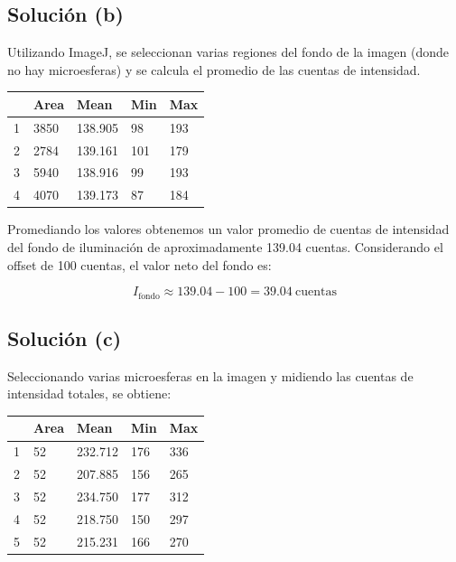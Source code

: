 \documentclass[11pt]{article}
\begin{document}
\subsection*{Solución (b)}

Utilizando ImageJ, se seleccionan varias regiones del fondo de la imagen (donde no hay microesferas) y se calcula el promedio de las cuentas de intensidad.

\begin{table}
    \centering
    \begin{tabular}{|l|l|l|l|l|}
    \hline
        ~ & Area & Mean & Min & Max \\ \hline
        1 & 3850 & 138.905 & 98 & 193 \\ \hline
        2 & 2784 & 139.161 & 101 & 179 \\ \hline
        3 & 5940 & 138.916 & 99 & 193 \\ \hline
        4 & 4070 & 139.173 & 87 & 184 \\ \hline
    \end{tabular}
\end{table}

Promediando los valores obtenemos un valor promedio de cuentas de intensidad del fondo de iluminación de aproximadamente 139.04 cuentas. Considerando el offset de 100 cuentas, el valor neto del fondo es:

\begin{equation*}
    I_{\text{fondo}} \approx 139.04 - 100 = 39.04\ \text{cuentas}
\end{equation*}

\subsection*{Solución (c)}

Seleccionando varias microesferas en la imagen y midiendo las cuentas de intensidad totales, se obtiene:

\begin{table}[!ht]
    \centering
    \begin{tabular}{|l|l|l|l|l|}
    \hline
        ~ & Area & Mean & Min & Max \\ \hline
        1 & 52 & 232.712 & 176 & 336 \\ \hline
        2 & 52 & 207.885 & 156 & 265 \\ \hline
        3 & 52 & 234.750 & 177 & 312 \\ \hline
        4 & 52 & 218.750 & 150 & 297 \\ \hline
        5 & 52 & 215.231 & 166 & 270 \\ \hline
    \end{tabular}
\end{table}
\end{document}
